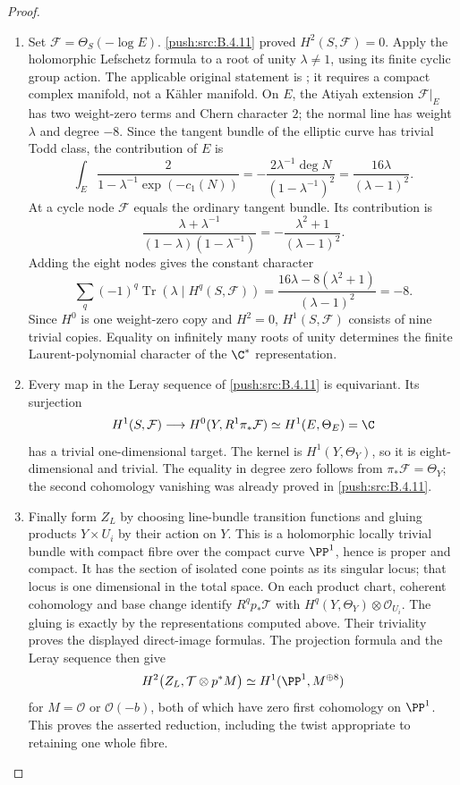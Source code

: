 \begin{proof}
\begin{enumerate}[label=\arabic*.,leftmargin=*]
\item Set $\mathcal F=\Theta_S(-\log E)$.
\ref{push:src:B.4.11} proved $H^2(S,\mathcal F)=0$.
Apply the holomorphic Lefschetz formula to a root of unity
$\lambda\ne1$, using its finite cyclic group action.
The applicable original statement is
\citet[Theorem~(4.6), p.~566]{AtiyahSinger1968IIIE}; it requires
a compact complex manifold, not a K\"ahler manifold.
On $E$, the Atiyah extension $\mathcal F|_E$ has two
weight-zero terms and Chern character $2$; the normal line
has weight $\lambda$ and degree $-8$.
Since the tangent bundle of the elliptic curve has trivial
Todd class, the contribution of $E$ is
\[
 \int_E\frac{2}{1-\lambda^{-1}\exp(-c_1(N))}
   =-\frac{2\lambda^{-1}\deg N}
           {(1-\lambda^{-1})^2}
   =\frac{16\lambda}{(\lambda-1)^2}.
\]
At a cycle node $\mathcal F$ equals the ordinary tangent
bundle.  Its contribution is
\[
 \frac{\lambda+\lambda^{-1}}
      {(1-\lambda)(1-\lambda^{-1})}
   =-\frac{\lambda^2+1}{(\lambda-1)^2}.
\]
Adding the eight nodes gives the constant character
\[
 \sum_q(-1)^q\operatorname{Tr}
       (\lambda\mid H^q(S,\mathcal F))
 =\frac{16\lambda-8(\lambda^2+1)}{(\lambda-1)^2}
 =-8.
\]
Since $H^0$ is one weight-zero copy and $H^2=0$,
$H^1(S,\mathcal F)$ consists of nine trivial copies.
Equality on infinitely many roots of unity determines the
finite Laurent-polynomial character of the $\C^*$ representation.

\item Every map in the Leray sequence of \ref{push:src:B.4.11} is equivariant.
Its surjection
\[
 H^1(S,\mathcal F)\longrightarrow
 H^0(Y,R^1\pi_*\mathcal F)
       \simeq H^1(E,\Theta_E)=\C
\]
has a trivial one-dimensional target.
The kernel is $H^1(Y,\Theta_Y)$, so it is eight-dimensional
and trivial.  The equality in degree zero follows from
$\pi_*\mathcal F=\Theta_Y$; the second cohomology vanishing
was already proved in \ref{push:src:B.4.11}.

\item Finally form $Z_L$ by choosing line-bundle transition functions
and gluing products $Y\times U_i$ by their action on $Y$.
This is a holomorphic locally trivial bundle with compact
fibre over the compact curve $\PP^1$, hence is proper and
compact.  It has the section of isolated cone points as its
singular locus; that locus is one dimensional in the total
space.  On each product chart, coherent cohomology and base
change identify $R^qp_*\mathcal T$ with
$H^q(Y,\Theta_Y)\otimes\mathcal O_{U_i}$.
The gluing is exactly by the representations computed above.
Their triviality proves the displayed direct-image formulas.
The projection formula and the Leray sequence then give
\[
 H^2\bigl(Z_L,\mathcal T\otimes p^*M\bigr)
      \simeq H^1(\PP^1,M^{\oplus8})
\]
for $M=\mathcal O$ or $\mathcal O(-b)$, both of which have
zero first cohomology on $\PP^1$.
This proves the asserted reduction, including the twist
appropriate to retaining one whole fibre.


\end{enumerate}
\end{proof}
